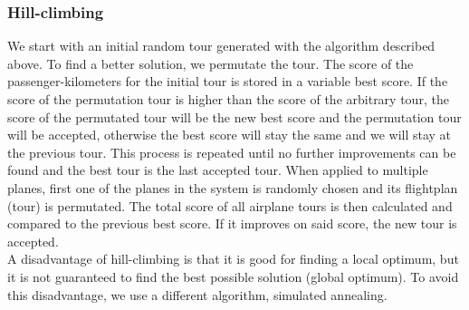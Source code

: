 \documentclass[journal]{IEEEtran}
\begin{document}
\subsubsection{Hill-climbing}
We start with an initial random tour generated with the algorithm described above. To find a better solution, we permutate the tour. The score of the passenger-kilometers for the initial tour is stored in a variable best score. If the score of the permutation tour is higher than the score of the arbitrary tour, the score of the permutated tour will be the new best score and the permutation tour will be accepted, otherwise the best score will stay the same and we will stay at the previous tour. This process is repeated until no further improvements can be found and the best tour is the last accepted tour. When applied to multiple planes, first one of the planes in the system is randomly chosen and its flightplan (tour) is permutated. The total score of all airplane tours is then calculated and compared to the previous best score. If it improves on said score, the new tour is accepted.\\
A disadvantage of hill-climbing is that it is good for finding a local optimum, but it is not guaranteed to find the best possible solution (global optimum). To avoid this disadvantage, we use a different algorithm, simulated annealing. \\
\end{document}
